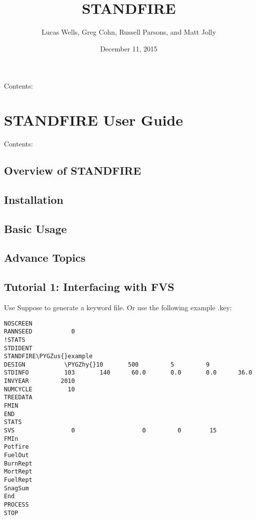 \documentclass[letterpaper,10pt,english]{sphinxmanual}
\title{STANDFIRE}
\date{December 11, 2015}
\author{Lucas Wells, Greg Cohn, Russell Parsons, and Matt Jolly}
\def\PYGZus{\char`\_}
\def\PYGZhy{\char`\-}
\begin{document}
\maketitle
\tableofcontents
{}\label{index::doc}


Contents:


\chapter{STANDFIRE User Guide}
\label{user_guide:standfire-user-guide}\label{user_guide::doc}\label{user_guide:welcome-to-standfire}
Contents:


\section{Overview of STANDFIRE}
\label{overview:overview-of-standfire}\label{overview::doc}

\section{Installation}
\label{installation:installation}\label{installation::doc}

\section{Basic Usage}
\label{basic_usage::doc}\label{basic_usage:basic-usage}

\section{Advance Topics}
\label{advance_topics:advance-topics}\label{advance_topics::doc}

\section{Tutorial 1: Interfacing with FVS}
\label{tutorial_1:tutorial-1-interfacing-with-fvs}\label{tutorial_1::doc}
Use Suppose to generate a keyword file. Or use the following example .key:

\begin{Verbatim}[commandchars=\\\{\}]
NOSCREEN
RANNSEED           0
!STATS
STDIDENT
STANDFIRE\PYGZus{}example
DESIGN           \PYGZhy{}10       500         5         9
STDINFO          103       140      60.0       0.0       0.0      36.0
INVYEAR         2010
NUMCYCLE          10
TREEDATA
FMIN
END
STATS
SVS                0                   0         0        15
FMIn
Potfire
FuelOut
BurnRept
MortRept
FuelRept
SnagSum
End
PROCESS
STOP
\end{Verbatim}
\end{document}
